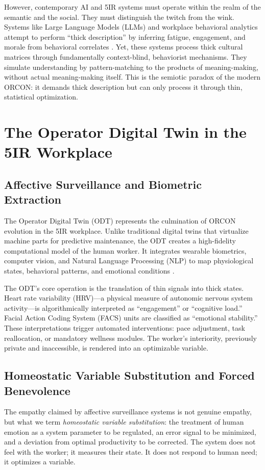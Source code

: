 \documentclass[11pt, a4paper]{article}
\begin{document}
However, contemporary AI and 5IR systems must operate within the realm of the semantic and the social. They must distinguish the twitch from the wink. Systems like Large Language Models (LLMs) and workplace behavioral analytics attempt to perform ``thick description'' by inferring fatigue, engagement, and morale from behavioral correlates \cite{crawford2021}. Yet, these systems process thick cultural matrices through fundamentally context-blind, behaviorist mechanisms. They simulate understanding by pattern-matching to the products of meaning-making, without actual meaning-making itself. This is the semiotic paradox of the modern ORCON: it demands thick description but can only process it through thin, statistical optimization.

\section{The Operator Digital Twin in the 5IR Workplace}

\subsection{Affective Surveillance and Biometric Extraction}
The Operator Digital Twin (ODT) represents the culmination of ORCON evolution in the 5IR workplace. Unlike traditional digital twins that virtualize machine parts for predictive maintenance, the ODT creates a high-fidelity computational model of the human worker. It integrates wearable biometrics, computer vision, and Natural Language Processing (NLP) to map physiological states, behavioral patterns, and emotional conditions \cite{zuboff2019}. 

The ODT's core operation is the translation of thin signals into thick states. Heart rate variability (HRV)---a physical measure of autonomic nervous system activity---is algorithmically interpreted as ``engagement'' or ``cognitive load.'' Facial Action Coding System (FACS) units are classified as ``emotional stability.'' These interpretations trigger automated interventions: pace adjustment, task reallocation, or mandatory wellness modules. The worker's interiority, previously private and inaccessible, is rendered into an optimizable variable. 

\subsection{Homeostatic Variable Substitution and Forced Benevolence}
The empathy claimed by affective surveillance systems is not genuine empathy, but what we term \textit{homeostatic variable substitution}: the treatment of human emotion as a system parameter to be regulated, an error signal to be minimized, and a deviation from optimal productivity to be corrected. The system does not feel with the worker; it measures their state. It does not respond to human need; it optimizes a variable.
\end{document}
